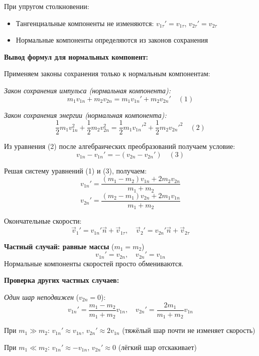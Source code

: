 \newpage
При упругом столкновении:
\begin{itemize}
    \item Тангенциальные компоненты не изменяются: $v_{1\tau}' = v_{1\tau}$, $v_{2\tau}' = v_{2\tau}$
    \item Нормальные компоненты определяются из законов сохранения
\end{itemize}

\begin{center}
    \textbf{Вывод формул для нормальных компонент:}
\end{center}

Применяем законы сохранения только к нормальным компонентам:

\textit{Закон сохранения импульса (нормальная компонента):}
\[
m_1 v_{1n} + m_2 v_{2n} = m_1 v_{1n}' + m_2 v_{2n}' \quad (1)
\]

\textit{Закон сохранения энергии (нормальная компонента):}
\[
\frac{1}{2}m_1 v_{1n}^2 + \frac{1}{2}m_2 v_{2n}^2 = \frac{1}{2}m_1 v_{1n}'^2 + \frac{1}{2}m_2 v_{2n}'^2 \quad (2)
\]

Из уравнения (2) после алгебраических преобразований получаем условие:
\[
v_{1n} - v_{1n}' = -(v_{2n} - v_{2n}') \quad (3)
\]

Решая систему уравнений (1) и (3), получаем:
\[
v_{1n}' = \frac{(m_1 - m_2)v_{1n} + 2m_2 v_{2n}}{m_1 + m_2}
\]
\[
v_{2n}' = \frac{(m_2 - m_1)v_{2n} + 2m_1 v_{1n}}{m_1 + m_2}
\]

Окончательные скорости:
\[
\vec{v}_1' = v_{1n}'\vec{n} + \vec{v}_{1\tau}, \quad \vec{v}_2' = v_{2n}'\vec{n} + \vec{v}_{2\tau}
\]

\textbf{Частный случай: равные массы} ($m_1 = m_2$)
\[
v_{1n}' = v_{2n}, \quad v_{2n}' = v_{1n}
\]
Нормальные компоненты скоростей просто обмениваются.

\textbf{Проверка других частных случаев:}

\textit{Один шар неподвижен} ($v_{2n} = 0$):
\[
v_{1n}' = \frac{m_1 - m_2}{m_1 + m_2}v_{1n}, \quad v_{2n}' = \frac{2m_1}{m_1 + m_2}v_{1n}
\]

При $m_1 \gg m_2$: $v_{1n}' \approx v_{1n}$, $v_{2n}' \approx 2v_{1n}$ (тяжёлый шар почти не изменяет скорость)

При $m_1 \ll m_2$: $v_{1n}' \approx -v_{1n}$, $v_{2n}' \approx 0$ (лёгкий шар отскакивает)